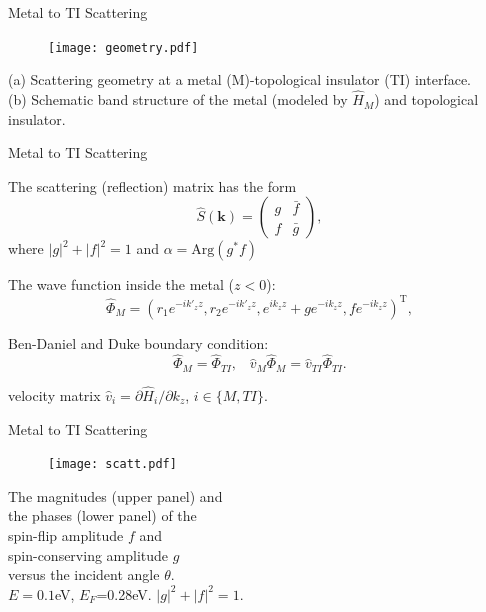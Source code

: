 \documentclass[]{beamer}
\def\v#1{\mathbf{#1}}
\begin{document}
\begin{frame}{Metal to TI Scattering}
\begin{figure}
\center
\texttt{[image: geometry.pdf]}
\end{figure}
(a) Scattering geometry at a metal (M)-topological insulator (TI) interface.\\
(b) Schematic band structure of the metal (modeled by $\hat{H}_M$) and topological insulator.
\end{frame}





\begin{frame}{Metal to TI Scattering}


The scattering (reflection) matrix has the form
\[
\hat{S}(\v{k})=\left(
\begin{array}{ll}
  g & \bar{f}   \\
  f & \bar{g}
  \end{array}
\right),
\]
where $|g|^2+|f|^2=1$ and  $\alpha=\mathrm{Arg}(g^*f)$

The wave function inside the metal ($z<0$):
\[
\hat{\Phi}_M=(r_1e^{-ik'_{z} z},r_2e^{-ik'_{z}z},e^{ik_{z}z}+g e^{-ik_{z}z} ,f e^{-ik_{z}z})^{\mathrm{T}},
\]

Ben-Daniel and Duke boundary condition:
\[
\hat{\Phi}_M=\hat{\Phi}_{TI}, \;\;\; \hat{v}_M \hat{\Phi}_M = \hat{v}_{TI}\hat{\Phi}_{TI}.
\]

velocity matrix $\hat{v}_{i}=\partial \hat{H}_i/\partial k_z$, $i\in \{M, TI\}$. 


\end{frame}




\begin{frame}{Metal to TI Scattering}
\begin{figure}
\vspace{-50pt}
\texttt{[image: scatt.pdf]}
\end{figure}
The magnitudes (upper panel) and \\ 
the phases (lower panel) of the \\
spin-flip amplitude $f$ and \\
spin-conserving amplitude $g$ \\
versus the incident angle $\theta$. \\
$E=0.1$eV, $E_F$=0.28eV. $|g|^2+|f|^2=1$.

\end{frame} 
\end{document}
